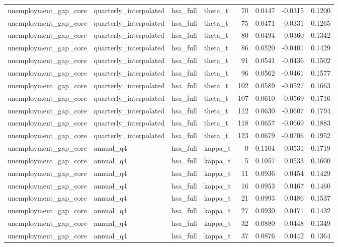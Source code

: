 \begin{tabular}{llllrrrr}
unemployment\_gap\_core & quarterly\_interpolated & hsa\_full & theta\_t & 70 & 0.0447 & -0.0315 & 0.1200 \\
unemployment\_gap\_core & quarterly\_interpolated & hsa\_full & theta\_t & 75 & 0.0471 & -0.0331 & 0.1265 \\
unemployment\_gap\_core & quarterly\_interpolated & hsa\_full & theta\_t & 80 & 0.0494 & -0.0360 & 0.1342 \\
unemployment\_gap\_core & quarterly\_interpolated & hsa\_full & theta\_t & 86 & 0.0520 & -0.0401 & 0.1429 \\
unemployment\_gap\_core & quarterly\_interpolated & hsa\_full & theta\_t & 91 & 0.0541 & -0.0436 & 0.1502 \\
unemployment\_gap\_core & quarterly\_interpolated & hsa\_full & theta\_t & 96 & 0.0562 & -0.0461 & 0.1577 \\
unemployment\_gap\_core & quarterly\_interpolated & hsa\_full & theta\_t & 102 & 0.0589 & -0.0527 & 0.1663 \\
unemployment\_gap\_core & quarterly\_interpolated & hsa\_full & theta\_t & 107 & 0.0610 & -0.0569 & 0.1716 \\
unemployment\_gap\_core & quarterly\_interpolated & hsa\_full & theta\_t & 112 & 0.0630 & -0.0607 & 0.1794 \\
unemployment\_gap\_core & quarterly\_interpolated & hsa\_full & theta\_t & 118 & 0.0657 & -0.0669 & 0.1883 \\
unemployment\_gap\_core & quarterly\_interpolated & hsa\_full & theta\_t & 123 & 0.0679 & -0.0706 & 0.1952 \\
unemployment\_gap\_core & annual\_q4 & hsa\_full & kappa\_t & 0 & 0.1104 & 0.0531 & 0.1719 \\
unemployment\_gap\_core & annual\_q4 & hsa\_full & kappa\_t & 5 & 0.1057 & 0.0533 & 0.1600 \\
unemployment\_gap\_core & annual\_q4 & hsa\_full & kappa\_t & 11 & 0.0936 & 0.0454 & 0.1429 \\
unemployment\_gap\_core & annual\_q4 & hsa\_full & kappa\_t & 16 & 0.0953 & 0.0467 & 0.1460 \\
unemployment\_gap\_core & annual\_q4 & hsa\_full & kappa\_t & 21 & 0.0993 & 0.0486 & 0.1537 \\
unemployment\_gap\_core & annual\_q4 & hsa\_full & kappa\_t & 27 & 0.0930 & 0.0471 & 0.1432 \\
unemployment\_gap\_core & annual\_q4 & hsa\_full & kappa\_t & 32 & 0.0880 & 0.0448 & 0.1349 \\
unemployment\_gap\_core & annual\_q4 & hsa\_full & kappa\_t & 37 & 0.0876 & 0.0442 & 0.1364 \\

\end{tabular}
